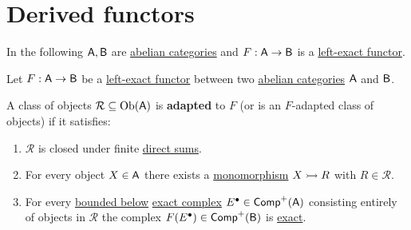 \documentclass[../../../main]{subfiles}
\begin{document}
\section{Derived functors}

In the following \(\category{A}, \category{B}\) are \hyperref[def:abelian-category]{abelian categories} and \(F: \category{A} \to \category{B}\) is a \hyperref[def:exact-functor]{left-exact functor}.

\begin{definition}\label{def:adapted-class-of-objects}
  Let \(F: \category{A} \to \category{B}\) be a \hyperref[def:exact-functor]{left-exact functor} between two \hyperref[def:abelian-category]{abelian categories} \(\category{A}\) and \(\category{B}\).
  
  A class of objects \(\mathcal{R} \subseteq \operatorname{Ob}(\category{A})\) is \textbf{adapted} to \(F\) (or is an \(F\)-adapted class of objects) if it satisfies:
  \begin{enumerate}[label=\(\mathcal{R}\).\arabic*), ref=\(\mathcal{R}\).\arabic*]
    \item\label{axiom:R-class-closed} \(\mathcal{R}\) is closed under finite \hyperref[def:direct-sum]{direct sums}.
    \item\label{axiom:R-class-monomorphism} For every object \(X \in \category{A}\) there exists a \hyperref[def:mono-epi-morphism]{monomorphism} \(X \monoarrow R\) with \(R \in \mathcal{R}\).
    \item\label{axiom:R-class-complex} For every \hyperref[def:bounded-complexes]{bounded below} \hyperref[def:exact-complex]{exact complex} \(E^{\bullet} \in \Complex[+]{\category{A}}\) consisting entirely of objects in \(\mathcal{R}\) the complex \(F(E^{\bullet}) \in \Complex[+]{\category{B}}\) is \hyperref[def:exact-complex]{exact}.
  \end{enumerate}
\end{definition}
\end{document}
